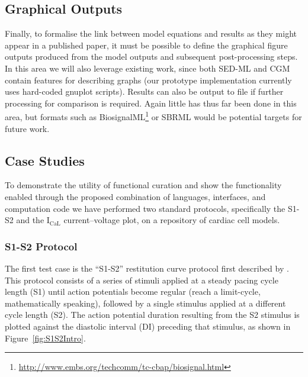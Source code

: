 \documentclass[preprint,authoryear,12pt]{elsarticle}
\begin{document}
\subsection{Graphical Outputs}
\label{sec:proto-results}

Finally, to formalise the link between model equations and results as they might appear in a published paper, it must be possible to define the graphical figure outputs produced from the model outputs and subsequent post-processing steps.
In this area we will also leverage existing work, since both SED-ML and CGM contain features for describing graphs (our prototype implementation currently uses hard-coded gnuplot scripts).
Results can also be output to file if further processing for comparison is required.
Again little has thus far been done in this area, but formats such as BiosignalML\footnote{\url{http://www.embs.org/techcomm/tc-cbap/biosignal.html}} or SBRML \citep{Dada*.10:SBRML} would be potential targets for future work.



\subsection{Case Studies}
\label{sec:case-studies}

To demonstrate the utility of functional curation and show the functionality
enabled through the proposed combination of languages, interfaces, and computation
code we have performed two standard protocols, specifically the S1-S2 and the
I$_\textrm{CaL}$ current--voltage plot, on a repository of cardiac cell models.


\subsubsection{S1-S2 Protocol}
\label{sec:intro-s1s2}

The first test case is the ``S1-S2'' restitution curve protocol first described by
\citet{nolasco1968graphic}. This protocol consists of a series of stimuli applied
at a steady pacing cycle length (S1) until action potentials become regular
(reach a limit-cycle, mathematically speaking), followed by a single stimulus
applied at a different cycle length (S2).
The action potential duration resulting from the S2 stimulus is plotted against
the diastolic interval (DI) preceding that stimulus, as shown in
Figure~\ref{fig:S1S2Intro}.
\end{document}
